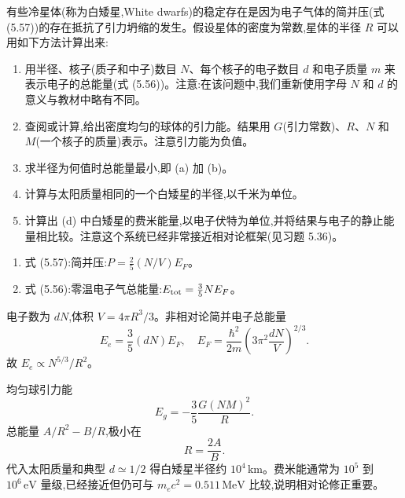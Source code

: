 \begin{question}
有些冷星体(称为白矮星,White dwarfs)的稳定存在是因为电子气体的简并压(式 (5.57))的存在抵抗了引力坍缩的发生。假设星体的密度为常数,星体的半径 $R$ 可以用如下方法计算出来:
\begin{enumerate}
\item 用半径、核子(质子和中子)数目 $N$、每个核子的电子数目 $d$ 和电子质量 $m$ 来表示电子的总能量(式 (5.56))。注意:在该问题中,我们重新使用字母 $N$ 和 $d$ 的意义与教材中略有不同。
\item 查阅或计算,给出密度均匀的球体的引力能。结果用 $G$(引力常数)、$R$、$N$ 和 $M$(一个核子的质量)表示。注意引力能为负值。
\item 求半径为何值时总能量最小,即 (a) 加 (b)。
\item 计算与太阳质量相同的一个白矮星的半径,以千米为单位。
\item 计算出 (d) 中白矮星的费米能量,以电子伏特为单位,并将结果与电子的静止能量相比较。注意这个系统已经非常接近相对论框架(见习题 5.36)。
\end{enumerate}

\par\smallskip
{}
\begin{enumerate}[leftmargin=2.2em,itemsep=0.12em,topsep=0.12em,parsep=0pt]
\item 式 (5.57):简并压:$P=\frac25(N/V)E_F$。
\item 式 (5.56):零温电子气总能量:$E_{\rm tot}=\frac35NE_F$。
\end{enumerate}

\end{question}
\begin{solution}

电子数为 $dN$,体积 $V=4\pi R^3/3$。非相对论简并电子总能量
\[
E_e=\frac35(dN)E_F,
\quad
E_F=\frac{\hbar^2}{2m}\left(3\pi^2\frac{dN}{V}\right)^{2/3}.
\]
故 $E_e\propto N^{5/3}/R^2$。

均匀球引力能
\[
E_g=-\frac35\frac{G(NM)^2}{R}.
\]
总能量 $A/R^2-B/R$,极小在
\[
R=\frac{2A}{B}.
\]
代入太阳质量和典型 $d\simeq1/2$ 得白矮星半径约 $10^4\,\mathrm{km}$。费米能通常为 $10^5$ 到 $10^6\,\mathrm{eV}$ 量级,已经接近但仍可与 $m_ec^2=0.511\,\mathrm{MeV}$ 比较,说明相对论修正重要。

\end{solution}

